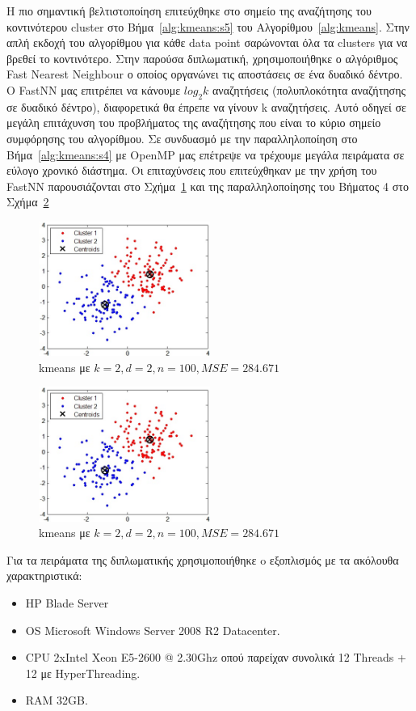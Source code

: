 \indent Η πιο σημαντική βελτιστοποίηση επιτεύχθηκε στο σημείο της αναζήτησης του κοντινότερου cluster στο Βήμα~\ref{alg:kmeans:s5} του Αλγορίθμου~\ref{alg:kmeans}. Στην απλή εκδοχή του αλγορίθμου για κάθε data point σαρώνονται όλα τα clusters για να βρεθεί το κοντινότερο. Στην παρούσα διπλωματική, χρησιμοποιήθηκε ο αλγόριθμος Fast Nearest Neighbour ο οποίος οργανώνει τις αποστάσεις σε ένα δυαδικό δέντρο. Ο FastNN μας επιτρέπει να κάνουμε $ log_{2} k $  αναζητήσεις (πολυπλοκότητα αναζήτησης σε δυαδικό δέντρο), διαφορετικά θα έπρεπε να γίνουν k αναζητήσεις. Αυτό οδηγεί σε μεγάλη επιτάχυνση του προβλήματος της αναζήτησης που είναι το κύριο σημείο συμφόρησης του αλγορίθμου. Σε συνδυασμό με την παραλληλοποίηση στο Βήμα~\ref{alg:kmeans:s4} με OpenMP μας επέτρεψε να τρέχουμε μεγάλα πειράματα σε εύλογο χρονικό διάστημα. Οι επιταχύνσεις που επιτεύχθηκαν με την χρήση του FastNN παρουσιάζονται στο Σχήμα~\ref{fig:fastnn} και της παραλληλοποίησης του Βήματος 4 στο Σχήμα~\ref{fig:ompiter}

\begin{figure}[h]
  \centering
  \includegraphics[width=0.5\textwidth]{chapter3/kmeans.jpg}
  \caption{kmeans με $k=2,d=2,n=100,MSE=284.671$}
  \label{fig:fastnn}
\end{figure}

\begin{figure}[h]
  \centering
  \includegraphics[width=0.5\textwidth]{chapter3/kmeans.jpg}
  \caption{kmeans με $k=2,d=2,n=100,MSE=284.671$}
  \label{fig:ompiter}
\end{figure}

\newpage

\indent Για τα πειράματα της διπλωματικής χρησιμοποιήθηκε o εξοπλισμός με τα ακόλουθα χαρακτηριστικά:
\begin{itemize}
    \item HP Blade Server
    \item OS Microsoft Windows Server 2008 R2 Datacenter.
    \item CPU 2xIntel Xeon E5-2600 @ 2.30Ghz οπού παρείχαν συνολικά 12 Threads + 12 με HyperThreading.
    \item RAM 32GB.
\end{itemize} 